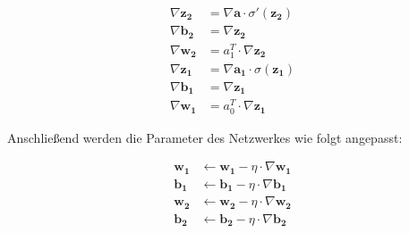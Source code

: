 \documentclass[a4paper,11pt]{article}
\begin{document}
\begin{align*}
    \nabla \bm{z_2} &= \nabla \bm{a} \cdot \sigma' (\bm{z_2}) \\
    \nabla \bm{b_2} &= \nabla \bm{z_2} \\
    \nabla \bm{w_2} &= a_1^T \cdot \nabla \bm{z_2} \\
    \nabla \bm{z_1} &= \nabla \bm{a_1} \cdot \sigma (\bm{z_1}) \\
    \nabla \bm{b_1} &= \nabla \bm{z_1} \\
    \nabla \bm{w_1} &= a_0^T \cdot \nabla \bm{z_1} 
\end{align*}{}

Anschließend werden die Parameter des Netzwerkes wie folgt angepasst:

\begin{align*}
   \bm{w_1} &\leftarrow \bm{w_1} - \eta \cdot \nabla \bm{w_1} \\
\bm{b_1} &\leftarrow \bm{b_1} - \eta \cdot \nabla \bm{b_1} \\
 \bm{w_2} &\leftarrow \bm{w_2} - \eta \cdot \nabla \bm{w_2} \\
    \bm{b_2} &\leftarrow \bm{b_2} - \eta \cdot \nabla \bm{b_2} \\
\end{align*}{}
\end{document}
